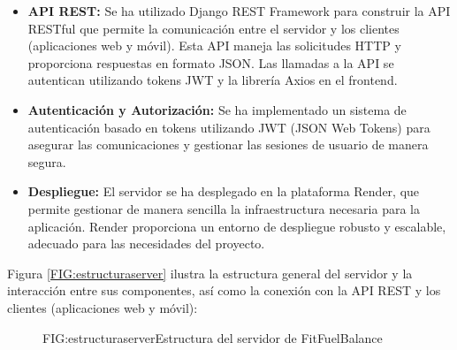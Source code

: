 \begin{itemize}
    \item \textbf{API REST:} Se ha utilizado Django REST Framework para construir la API RESTful que permite la comunicación entre el servidor y los clientes (aplicaciones web y móvil). Esta API maneja las solicitudes HTTP y proporciona respuestas en formato JSON. Las llamadas a la API se autentican utilizando tokens JWT y la librería Axios en el frontend.
    
    \item \textbf{Autenticación y Autorización:} Se ha implementado un sistema de autenticación basado en tokens utilizando JWT (JSON Web Tokens) para asegurar las comunicaciones y gestionar las sesiones de usuario de manera segura.
    
    \item \textbf{Despliegue:} El servidor se ha desplegado en la plataforma Render, que permite gestionar de manera sencilla la infraestructura necesaria para la aplicación. Render proporciona un entorno de despliegue robusto y escalable, adecuado para las necesidades del proyecto.
\end{itemize}

Figura \ref{FIG:estructuraserver} ilustra la estructura general del servidor y la interacción entre sus componentes, así como la conexión con la API REST y los clientes (aplicaciones web y móvil):

\begin{figure}[Distribución Estructura Servidor]{FIG:estructuraserver}{Estructura del servidor de FitFuelBalance}
\end{figure}